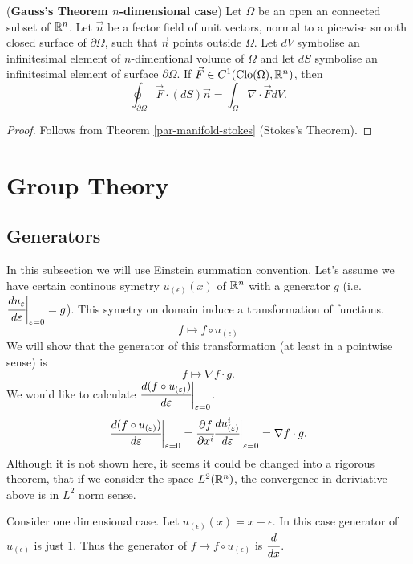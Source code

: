 \documentclass[main.tex]{subfiles}
\begin{document}
\begin{theorem}
\label{gauss-theorem-multidimensional}
(\textbf{Gauss's Theorem $n$-dimensional case})
\label{n-gauss-thoerem}
Let $\Omega$ be an open an connected subset of $\reals^n$. Let $\vec{n}$ be a fector field of unit vectors, normal to a picewise smooth closed surface of $\partial \Omega$, such that $\vec{n}$ points outside $\Omega$. Let $dV$ symbolise an infinitesimal element of $n$-dimentional volume of $\Omega$ and let $dS$ symbolise an infinitesimal element of surface $\partial \Omega$. If $\vec{F}\in C^1(\text{Clo}(\Omega), \reals^n)$, then
\begin{equation}
\oint_{\partial\Omega} \vec{F} \cdot (dS)\vec{n} = \int_\Omega \nabla \cdot \vec{F} dV.
\end{equation} 
\end{theorem}
\begin{proof}
Follows from Theorem \ref{par-manifold-stokes} (Stokes's Theorem).
\end{proof}   
\section{Group Theory}
\subsection{Generators}
In this subsection we will use Einstein summation convention.
Let's assume we have certain continous symetry $u_{(\epsilon)}(x)$ of $\reals^n$ with a generator $g$ (i.e. $\cfrac{du_{\epsilon}}{d\epsilon}\bigg\vert_{\epsilon=0} = g$). This symetry on domain induce a transformation of functions.
\begin{equation}
f \mapsto f\circ u_{(\epsilon)}
\end{equation}
We will show that the generator of this transformation (at least in a pointwise sense) is 
\begin{equation}
f\mapsto\nabla f \cdot g.
\end{equation}
We would like to calculate $\cfrac{d(f\circ u_{(\epsilon)})}{d\epsilon}\bigg\vert_{\epsilon=0}$.
\begin{equation}
\cfrac{d(f\circ u_{(\epsilon)})}{d\epsilon} \bigg\vert_{\epsilon=0}= \cfrac{\partial f}{\partial x^i}\cfrac{du_{(\epsilon)}^i}{d\epsilon}\bigg\vert_{\epsilon=0} = \nabla f \cdot g.
\end{equation}
Although it is not shown here, it seems it could be changed into a rigorous theorem, that if we consider the space $L^2(\reals^n)$, the convergence in deriviative above is in $L^2$ norm sense.
\begin{example}
Consider one dimensional case. Let $u_{(\epsilon)}(x) = x + \epsilon$. In this case generator of $u_{(\epsilon)}$ is just $1$. Thus the generator of $f \mapsto f\circ u_{(\epsilon)}$ is $\cfrac{d}{dx}$.
\end{example}
\end{document}
